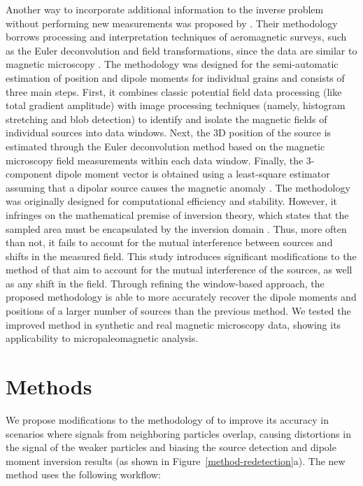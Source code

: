 \documentclass[onecolumn,12pt,a4paper]{article}
\begin{document}
Another way to incorporate additional information to the inverse problem without performing new measurements was proposed by \citet{Souza-Junior2024}. Their methodology borrows processing and interpretation techniques of aeromagnetic surveys, such as the Euler deconvolution and field transformations, since the data are similar to magnetic microscopy \citep{Weiss2007}. The methodology was designed for the semi-automatic estimation of position and dipole moments for individual grains and consists of three main steps. First, it combines classic potential field data processing (like total gradient amplitude) with image processing techniques (namely, histogram stretching and blob detection) to identify and isolate the magnetic fields of individual sources into data windows. Next, the 3D position of the source is estimated through the Euler deconvolution method \citep{Reid1990} based on the magnetic microscopy field measurements within each data window. Finally, the 3-component dipole moment vector is obtained using a least-square estimator assuming that a dipolar source causes the magnetic anomaly \citep{Oliveira2015Estimation}. The methodology was originally designed for computational efficiency and stability. However, it infringes on the mathematical premise of inversion theory, which states that the sampled area must be encapsulated by the inversion domain \citep{Baratchart2013, Lima2013}. Thus, more often than not, it fails to account for the mutual interference between sources and shifts in the measured field. This study introduces significant modifications to the method of \citet{Souza-Junior2024} that aim to account for the mutual interference of the sources, as well as any shift in the field. Through refining the window-based approach, the proposed methodology is able to more accurately recover the dipole moments and positions of a larger number of sources than the previous method. We tested the improved method in synthetic and real magnetic microscopy data, showing its applicability to micropaleomagnetic analysis.


\section{Methods}

We propose modifications to the methodology of \citet{Souza-Junior2024} to improve its accuracy in scenarios where signals from neighboring particles overlap, causing distortions in the signal of the weaker particles and biasing the source detection and dipole moment inversion results (as shown in Figure~\ref{method-redetection}a). The new method uses the following workflow:
\end{document}

